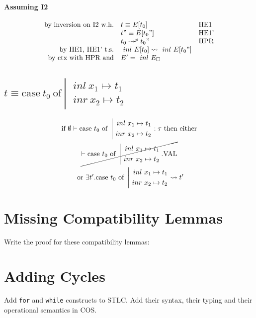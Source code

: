 \documentclass{article}
\newcommand{\inl}[0]{\ensuremath{\ inl\ }}
\newcommand{\inr}[0]{\ensuremath{\ inr\ }}
\newcommand{\case}[3]{\ensuremath{\text{case}\ #1\ \text{of}\ \left|\begin{aligned}#2\\#3\end{aligned}\right.}}
\begin{document}
\paragraph{Assuming I2}
\[
    \begin{array}{rl @{\quad} l}
        \text{by inversion on I2 w.h.}   &  t \equiv E[t_0]         & \text{HE1}\\
                                         &  t" \equiv E[t_0"]        & \text{HE1'}\\
                                         &  t_0 \leadsto^p t_0"     & \text{HPR}\\
        \text{by HE1, HE1' t.s.}         &  \inl E[t_0] \leadsto \inl E[t_0"] \\
        \text{by ctx with HPR and}       &  E' = \inl E _\square \\
    \end{array}
\]

\subsection{$t \equiv \case{t_0}{\inl x_1 \mapsto t_1}{\inr x_2 \mapsto t_2}$}
\begin{multline*}
    \text{ if } \emptyset \vdash \case{t_0}{\inl x_1 \mapsto t_1}{\inr x_2 \mapsto t_2}:\tau \text{ then either } \\ \cancel{ \vdash \case{t_0}{\inl x_1 \mapsto t_1}{\inr x_2 \mapsto t_2}.\text{VAL} } \\ \text{ or } \exists t'.\case{t_0}{\inl x_1 \mapsto t_1}{\inr x_2 \mapsto t_2}\leadsto t'
\end{multline*} 

\section{Missing Compatibility Lemmas}
Write the proof for these compatibility lemmas:

\section{Adding Cycles}
Add \texttt{for} and \texttt{while} constructs to STLC. Add their syntax, their typing and their operational
semantics in COS.
\end{document}
